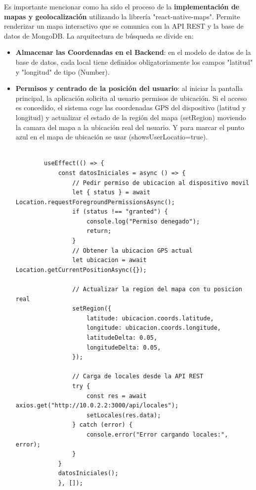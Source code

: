 \documentclass[a4paper,11pt]{article}
\begin{document}
Es importante mencionar como ha sido el proceso de la \textbf{implementación de mapas y geolocalización} utilizando la librería "react-native-maps". Permite renderizar un mapa interactivo que se comunica con la API REST y la base de datos de MongoDB. La arquitectura de búsqueda se divide en: 
\begin{itemize}
    \item \textbf{Almacenar las Coordenadas en el Backend}: en el modelo de datos de la base de datos, cada local tiene definidos obligatoriamente los campos "latitud" y "longitud" de tipo (Number). 
    \item \textbf{Permisos y centrado de la posición del usuario}: al iniciar la pantalla principal, la aplicación solicita al usuario permisos de ubicación. Si el acceso es concedido, el sistema coge las coordenadas GPS del dispositivo (latitud y longitud) y actualizar el estado de la región del mapa (setRegion) moviendo la camara del mapa a la ubicación real del usuario. Y para marcar el punto azul en el mapa de ubicación se usar (showsUserLocatio={true}).
     \vspace{0.2cm}
    \begin{lstlisting}[style=javascript, caption={Permisos y ubicación del usuario.}]

        useEffect(() => {
            const datosIniciales = async () => {
                // Pedir permiso de ubicacion al dispositivo movil
                let { status } = await Location.requestForegroundPermissionsAsync();
                if (status !== "granted") {
                    console.log("Permiso denegado");
                    return;
                }
                // Obtener la ubicacion GPS actual
                let ubicacion = await Location.getCurrentPositionAsync({});
                
                // Actualizar la region del mapa con tu posicion real
                setRegion({
                    latitude: ubicacion.coords.latitude,
                    longitude: ubicacion.coords.longitude,
                    latitudeDelta: 0.05,
                    longitudeDelta: 0.05,
                });
                
                // Carga de locales desde la API REST
                try {
                    const res = await axios.get("http://10.0.2.2:3000/api/locales");
                    setLocales(res.data);
                } catch (error) {
                    console.error("Error cargando locales:", error);
                }
            }
            datosIniciales();
            }, []);
        

\end{lstlisting}
\end{itemize}
\end{document}
